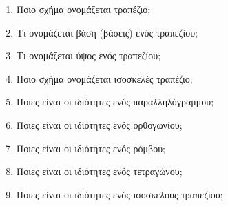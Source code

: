 \documentclass[a4paper,11pt]{report}
\begin{document}
\begin{enumerate}
\item Ποιο σχήμα ονομάζεται τραπέζιο;
\item Τι ονομάζεται βάση (βάσεις) ενός τραπεζίου;
\item Τι ονομάζεται ύψος ενός τραπεζίου;
\item Ποιο σχήμα ονομάζεται ισοσκελές τραπέζιο;
\item Ποιες είναι οι ιδιότητες ενός παραλληλόγραμμου;
\item Ποιες είναι οι ιδιότητες ενός ορθογωνίου;
\item Ποιες είναι οι ιδιότητες ενός ρόμβου;
\item Ποιες είναι οι ιδιότητες ενός  τετραγώνου;
\item Ποιες είναι οι ιδιότητες ενός ισοσκελούς τραπεζίου;
\end{enumerate}
\end{document}
